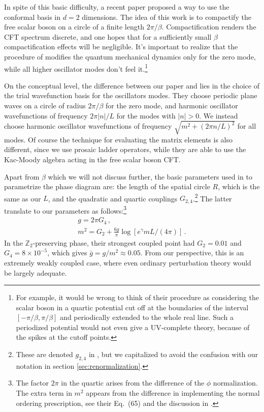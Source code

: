 \documentclass[11pt]{article}
\def\bZ {\mathbb{Z}}
\def\bZ {\mathbb{Z}}
\numberwithin{equation}{section}
\begin{document}
In spite of this basic difficulty, a recent paper \cite{Coser:2014lla} proposed a way to use the conformal basis in $d=2$ dimensions. The idea of this work is to compactify the free scalar boson on a circle of a finite length $2\pi/\beta$. Compactification renders the CFT spectrum discrete, and one hopes that for a sufficiently small $\beta$ compactification effects will be negligible. It's important to realize that the procedure of \cite{Coser:2014lla} modifies the quantum mechanical dynamics only for the zero mode, while all higher oscillator modes don't feel 
it.\footnote{For example, it would be wrong to think of their procedure as considering the scalar boson in a quartic potential cut off at the boundaries of the interval $[-\pi/\beta,\pi/\beta]$ and periodically extended to the whole real line. Such a periodized potential would not even give a UV-complete theory, because of the spikes at the cutoff points.}

On the conceptual level, the difference between our paper and \cite{Coser:2014lla} lies in the choice of the trial wavefunction basis for the oscillators modes. They choose periodic plane waves on a circle of radius $2\pi/\beta$ for the zero mode, and harmonic oscillator wavefunctions
of frequency $2\pi |n|/L$ for the modes with $|n|>0$. We instead choose harmonic oscillator wavefunctions of frequency $\sqrt{m^2+(2\pi n/L)^2}$ for all modes. Of course the technique for evaluating the matrix elements is also different, since we use prosaic ladder operators, while they are able to use the Kac-Moody algebra acting in the free scalar boson CFT.

Apart from $\beta$ which we will not discuss further, the basic parameters used in \cite{Coser:2014lla} to parametrize the phase diagram are: the length of the spatial circle $R$, which is the same as our $L$, and the quadratic and quartic couplings $G_{2,4}$.\footnote{These are denoted $g_{2,4}$ in \cite{Coser:2014lla}, but we capitalized to avoid the confusion with our notation in section \ref{sec:renormalization}.} The latter translate to our parameters as follows:\footnote{The factor $2\pi$ in the quartic arises from the difference of the $\phi$ normalization. The extra term in $m^2$ appears from the difference in implementing the normal ordering prescription, see their Eq.~(65) and the discussion in \cite{Rychkov:2015vap}.} 
\begin{gather}
g=2\pi  G_4\,,\\
m^2=G_2+\frac{6g}{\pi}\log [e^\gamma mL/(4\pi)]\,.
\end{gather}
In the $\bZ_2$-preserving phase, their strongest coupled point had $G_2=0.01$ and $G_4=8\times 10^{-5}$, which gives $\bar g=g/m^2\approx 0.05$. From our perspective, this is an extremely weakly coupled case, where even ordinary perturbation theory would be largely adequate. 
\end{document}
